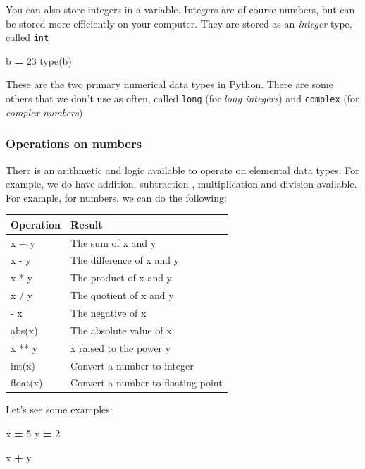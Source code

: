 \documentclass[
  letterpaper,
]{scrbook}
\newenvironment{Shaded}{\begin{snugshade}}{\end{snugshade}}
\newcommand{\BuiltInTok}[1]{#1}
\newcommand{\DecValTok}[1]{\textcolor[rgb]{0.00,0.00,0.81}{#1}}
\newcommand{\NormalTok}[1]{#1}
\newcommand{\OperatorTok}[1]{\textcolor[rgb]{0.81,0.36,0.00}{\textbf{#1}}}
\begin{document}
You can also store integers in a variable. Integers are of course numbers, but can be stored more efficiently on your computer. They are stored as an \emph{integer} type, called \texttt{int}

\begin{Shaded}
\begin{Highlighting}[]
\NormalTok{b }\OperatorTok{=} \DecValTok{23}
\BuiltInTok{type}\NormalTok{(b)}
\end{Highlighting}
\end{Shaded}

These are the two primary numerical data types in Python. There are some others that we don't use as often, called \texttt{long} (for \emph{long integers}) and \texttt{complex} (for \emph{complex numbers})

\hypertarget{operations-on-numbers}{%
\subsubsection{Operations on numbers}\label{operations-on-numbers}}

There is an arithmetic and logic available to operate on elemental data types. For example, we do have addition, subtraction , multiplication and division available. For example, for numbers, we can do the following:

\begin{longtable}[]{@{}ll@{}}
\toprule
Operation & Result\tabularnewline
\midrule
\endhead
x + y & The sum of x and y\tabularnewline
x - y & The difference of x and y\tabularnewline
x * y & The product of x and y\tabularnewline
x / y & The quotient of x and y\tabularnewline
- x & The negative of x\tabularnewline
abs(x) & The absolute value of x\tabularnewline
x ** y & x raised to the power y\tabularnewline
int(x) & Convert a number to integer\tabularnewline
float(x) & Convert a number to floating point\tabularnewline
\bottomrule
\end{longtable}

Let's see some examples:

\begin{Shaded}
\begin{Highlighting}[]
\NormalTok{x }\OperatorTok{=} \DecValTok{5}
\NormalTok{y }\OperatorTok{=} \DecValTok{2}
\end{Highlighting}
\end{Shaded}

\begin{Shaded}
\begin{Highlighting}[]
\NormalTok{x }\OperatorTok{+}\NormalTok{ y}
\end{Highlighting}
\end{Shaded}
\end{document}
